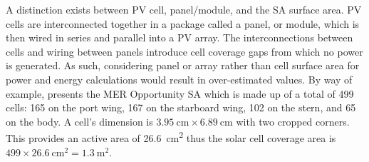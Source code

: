 A distinction exists between \ac{PV} cell, panel/module, and the \ac{SA} surface area. \ac{PV} cells are interconnected together in a package called a panel, or module, which is then wired in series and parallel into a \ac{PV} array. The interconnections between cells and wiring between panels introduce cell coverage gaps from which no power is generated. As such, considering panel or array rather than cell surface area for power and energy calculations would result in over-estimated values. By way of example,  presents the \ac{MER} Opportunity \ac{SA} which is made up of a total of 499 cells: 165 on the port wing, 167 on the starboard wing, 102 on the stern, and 65 on the body. A cell's dimension is $\SI{3.95}{\centi\meter} \times \SI{6.89}{\centi\meter}$ with two cropped corners. This provides an active area of \SI{26.6}{\centi\meter\squared} thus the solar cell coverage area is $499 \times \SI{26.6}{\centi\meter\squared} = \SI{1.3}{\meter\squared}$.


